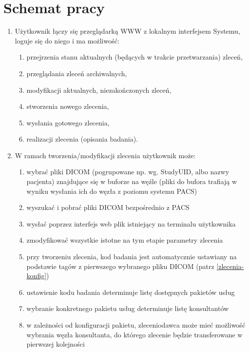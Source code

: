 \documentclass[a4paper]{report}
\begin{document}
\section{Schemat pracy}
\begin{enumerate}
\item Użytkownik łączy się przeglądarką WWW z lokalnym interfejsem Systemu, loguje się do niego i ma możliwość:
        \begin{enumerate}
        \item przejrzenia stanu aktualnych (będących w trakcie przetwarzania) zleceń,
        \item przeglądania zleceń archiwalnych,
        \item modyfikacji aktualnych, niezakończonych zleceń,
        \item stworzenia nowego zlecenia,
        \item wysłania gotowego zlecenia,
        \item realizacji zlecenia (opisania badania).
        \end{enumerate}
\item W ramach tworzenia/modyfikacji zlecenia użytkownik może:
        \begin{enumerate}
        \item wybrać pliki DICOM (pogrupowane np. wg. StudyUID, albo nazwy pacjenta) znajdujące się w buforze na węźle (pliki do bufora trafiają w wyniku wysłania ich do węzła z poziomu systemu PACS)
        \item wyszukać i pobrać pliki DICOM bezpośrednio z PACS
        \item wysłać poprzez interfejs web plik istniejący na terminalu użytkownika
        \item zmodyfikować wszystkie istotne na tym etapie parametry zlecenia
        \item przy tworzeniu zlecenia, kod badania jest automatycznie ustawiany na podstawie tagów z pierwszego wybranego pliku DICOM (patrz \ref{zlecenia-konfig})
        \item ustawienie kodu badania determinuje listę dostępnych pakietów usług
        \item wybranie konkretnego pakietu usług determinuje listę konsultantów
        \item w zależności od konfiguracji pakietu, zleceniodawca może mieć możliwość wybrania węzła konsultanta, do którego zlecenie będzie transferowane w pierwszej kolejności
        \end{enumerate}
\end{enumerate}
\end{document}
